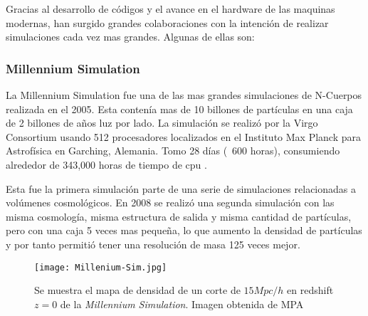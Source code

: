 Gracias al desarrollo de códigos y el avance en el hardware de las maquinas modernas, han surgido grandes colaboraciones con la intención de realizar simulaciones cada vez mas grandes. Algunas de ellas son:

\subsubsection{Millennium Simulation}

La Millennium Simulation fue una de las mas grandes simulaciones de N-Cuerpos realizada en el 2005. Esta contenía mas de 10 billones de partículas en una caja de 2 billones de años luz por lado. La simulación se realizó por la Virgo Consortium usando 512 procesadores localizados en el Instituto Max Planck para Astrofísica en Garching, Alemania. Tomo 28 días (~600 horas), consumiendo alrededor de 343,000 horas de tiempo de cpu \cite{2005Natur.435..629S}.

Esta fue la primera simulación parte de una serie de simulaciones relacionadas a volúmenes cosmológicos. En 2008 se realizó una segunda simulación con las misma cosmología, misma estructura de salida y misma cantidad de partículas, pero con una caja 5 veces mas pequeña, lo que aumento la densidad de partículas y por tanto permitió tener una resolución de masa 125 veces mejor.

\begin{figure}[H]
    \centering
    \texttt{[image: Millenium-Sim.jpg]}
    \caption[Millennium Simulation Cosmic Web]{Se muestra el mapa de densidad de un corte de $15 Mpc/h$ en redshift $z=0$ de la \textit{Millennium Simulation}. Imagen obtenida de MPA}
    \label{fig:Millennium_Sim}
\end{figure}


